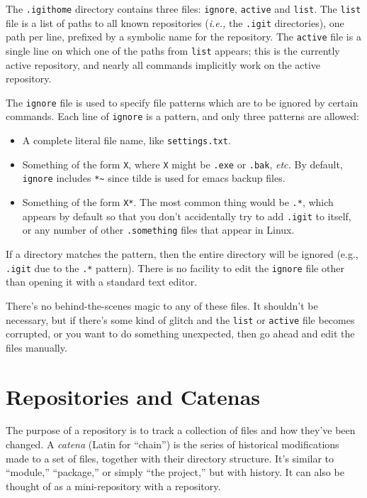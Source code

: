 \documentclass[10pt]{article}
\begin{document}
The {\tt .igithome} directory contains three files: {\tt ignore}, 
{\tt active} and {\tt list}. The {\tt list} file is a list of paths to
all known repositories ({\it i.e.,} the {\tt .igit} directories), one
path per line, prefixed by a symbolic name for the repository. The
{\tt active} file is a single line on which one of the paths
from {\tt list} appears; this is the currently active repository, and
nearly all commands implicitly work on the active repository.

The {\tt ignore} file is used to specify file patterns which are to be
ignored by certain commands. Each line of {\tt ignore} is a pattern,
and only three patterns are allowed: 
\pagebreak
\begin{itemize}
\item A complete literal file name, like {\tt settings.txt}.
\item Something of the form {\tt *X}, where {\tt X} might be {\tt .exe}
or {\tt .bak}, {\it etc.} By default, {\tt ignore} includes \verb=*~=
since tilde is used for emacs backup files.
\item Something of the form {\tt X*}. The most common thing would be
  {\tt .*}, which appears by default so that you don't accidentally
  try to add {\tt .igit} to itself, or any number of other
  {\tt .something} files that appear in Linux. 
\end{itemize}
If a directory matches the pattern, then the entire directory will be ignored
(e.g., {\tt .igit} due to the {\tt .*} pattern). There is no facility
to edit the {\tt ignore} file other than opening it with a standard text editor.

There's no behind-the-scenes magic to any of these files. It shouldn't be
necessary, but if there's some kind of glitch and the {\tt list} or
{\tt active} file becomes corrupted, or you want to do something
unexpected, then go ahead and edit the files manually.

\section{Repositories and Catenas}

The purpose of a repository is to track a collection of files and how
they've been changed. A {\it catena} (Latin for ``chain'') is the series
of historical modifications made to a set of files, together with
their directory structure. It's similar to ``module,'' ``package,'' or
simply ``the project,'' but with history. It can also be thought of as
a mini-repository with a repository. 
\end{document}
